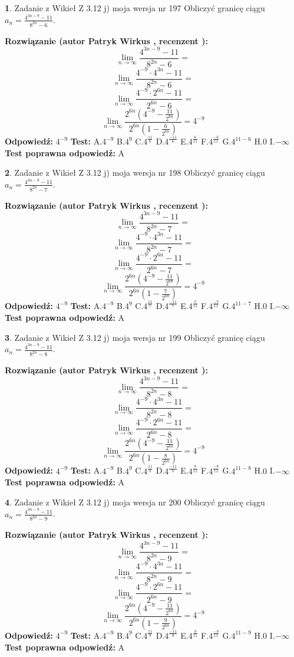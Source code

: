\documentclass[12pt, a4paper]{article}
\theoremstyle{definition} %
\newtheorem{zad}{}
\newcommand{\zadStart}[1]{\begin{zad}#1\newline}
\newcommand{\zadStop}{\end{zad}}
\newcommand{\rozwStart}[2]{\noindent \textbf{Rozwiązanie (autor #1 , recenzent #2): }\newline}
\newcommand{\rozwStop}{\newline}
\newcommand{\odpStart}{\noindent \textbf{Odpowiedź:}\newline}
\newcommand{\odpStop}{\newline}
\newcommand{\testStart}{\noindent \textbf{Test:}\newline}
\newcommand{\testStop}{\newline}
\newcommand{\kluczStart}{\noindent \textbf{Test poprawna odpowiedź:}\newline}
\newcommand{\kluczStop}{\newline}
\begin{document}
\zadStart{Zadanie z Wikieł Z 3.12 j) moja wersja nr 197}
Obliczyć granicę ciągu $a_{n}=\frac{4^{3n-9}-11}{8^{2n}-6}$.
\zadStop
\rozwStart{Patryk Wirkus}{}
$$\lim\limits_{n\to\infty}\frac{4^{3n-9}-11}{8^{2n}-6}=$$
$$\lim\limits_{n\to\infty}\frac{4^{-9} \cdot 4^{3n}-11}{8^{2n}-6}=$$
$$\lim\limits_{n\to\infty}\frac{4^{-9} \cdot 2^{6n}-11}{2^{6n}-6}=$$
$$\lim\limits_{n\to\infty}\frac{2^{6n}(4^{-9} - \frac{11}{2^{6n}})}{2^{6n}(1-\frac{6}{2^{6n}})}= 4^{-9}$$
\rozwStop
\odpStart
$4^{-9}$
\odpStop
\testStart
A.$4^{-9}$
B.$4^{9}$
C.$4^{\frac{11}{6}}$
D.$4^{\frac{-11}{6}}$
E.$4^{\frac{6}{11}}$
F.$4^{\frac{-6}{11}}$
G.$4^{11-6}$
H.$0$
I.$-\infty$
\testStop
\kluczStart
A
\kluczStop



\zadStart{Zadanie z Wikieł Z 3.12 j) moja wersja nr 198}
Obliczyć granicę ciągu $a_{n}=\frac{4^{3n-9}-11}{8^{2n}-7}$.
\zadStop
\rozwStart{Patryk Wirkus}{}
$$\lim\limits_{n\to\infty}\frac{4^{3n-9}-11}{8^{2n}-7}=$$
$$\lim\limits_{n\to\infty}\frac{4^{-9} \cdot 4^{3n}-11}{8^{2n}-7}=$$
$$\lim\limits_{n\to\infty}\frac{4^{-9} \cdot 2^{6n}-11}{2^{6n}-7}=$$
$$\lim\limits_{n\to\infty}\frac{2^{6n}(4^{-9} - \frac{11}{2^{6n}})}{2^{6n}(1-\frac{7}{2^{6n}})}= 4^{-9}$$
\rozwStop
\odpStart
$4^{-9}$
\odpStop
\testStart
A.$4^{-9}$
B.$4^{9}$
C.$4^{\frac{11}{7}}$
D.$4^{\frac{-11}{7}}$
E.$4^{\frac{7}{11}}$
F.$4^{\frac{-7}{11}}$
G.$4^{11-7}$
H.$0$
I.$-\infty$
\testStop
\kluczStart
A
\kluczStop



\zadStart{Zadanie z Wikieł Z 3.12 j) moja wersja nr 199}
Obliczyć granicę ciągu $a_{n}=\frac{4^{3n-9}-11}{8^{2n}-8}$.
\zadStop
\rozwStart{Patryk Wirkus}{}
$$\lim\limits_{n\to\infty}\frac{4^{3n-9}-11}{8^{2n}-8}=$$
$$\lim\limits_{n\to\infty}\frac{4^{-9} \cdot 4^{3n}-11}{8^{2n}-8}=$$
$$\lim\limits_{n\to\infty}\frac{4^{-9} \cdot 2^{6n}-11}{2^{6n}-8}=$$
$$\lim\limits_{n\to\infty}\frac{2^{6n}(4^{-9} - \frac{11}{2^{6n}})}{2^{6n}(1-\frac{8}{2^{6n}})}= 4^{-9}$$
\rozwStop
\odpStart
$4^{-9}$
\odpStop
\testStart
A.$4^{-9}$
B.$4^{9}$
C.$4^{\frac{11}{8}}$
D.$4^{\frac{-11}{8}}$
E.$4^{\frac{8}{11}}$
F.$4^{\frac{-8}{11}}$
G.$4^{11-8}$
H.$0$
I.$-\infty$
\testStop
\kluczStart
A
\kluczStop



\zadStart{Zadanie z Wikieł Z 3.12 j) moja wersja nr 200}
Obliczyć granicę ciągu $a_{n}=\frac{4^{3n-9}-11}{8^{2n}-9}$.
\zadStop
\rozwStart{Patryk Wirkus}{}
$$\lim\limits_{n\to\infty}\frac{4^{3n-9}-11}{8^{2n}-9}=$$
$$\lim\limits_{n\to\infty}\frac{4^{-9} \cdot 4^{3n}-11}{8^{2n}-9}=$$
$$\lim\limits_{n\to\infty}\frac{4^{-9} \cdot 2^{6n}-11}{2^{6n}-9}=$$
$$\lim\limits_{n\to\infty}\frac{2^{6n}(4^{-9} - \frac{11}{2^{6n}})}{2^{6n}(1-\frac{9}{2^{6n}})}= 4^{-9}$$
\rozwStop
\odpStart
$4^{-9}$
\odpStop
\testStart
A.$4^{-9}$
B.$4^{9}$
C.$4^{\frac{11}{9}}$
D.$4^{\frac{-11}{9}}$
E.$4^{\frac{9}{11}}$
F.$4^{\frac{-9}{11}}$
G.$4^{11-9}$
H.$0$
I.$-\infty$
\testStop
\kluczStart
A
\kluczStop
\end{document}

